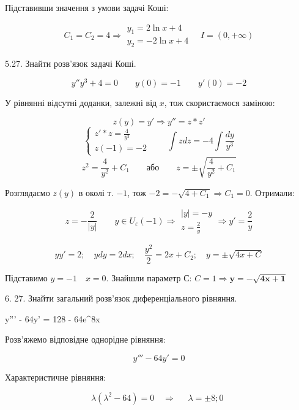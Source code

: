 \documentclass[14pt,a4paper]{scrartcl}
\theoremstyle{definition}
\theoremstyle{remark}
\theoremstyle{definition}
\theoremstyle{definition}
\begin{document}
Підставивши значення з умови задачі Коші:

$$
C_1 = C_2 = 4 \Longrightarrow \begin{gathered}
y_1 = 2\ln{x} + 4\\
y_2 = -2\ln{x} +4
\end{gathered}  \quad I = (0,  +\infty)
$$

\pagebreak

5.27. Знайти розв'язок задачі Коші.

$$
y''y^3 + 4 = 0 \qquad y(0) = -1 \qquad y'(0) = -2
$$

У рівнянні відсутні доданки, залежні від $x$, тож скористаємося заміною:

$$
z(y) = y' \Longrightarrow y'' = z * z'
$$
$$
\left\lbrace \begin{gathered}
z' * z = \frac{4}{y^3}\\
z(-1) = -2
\end{gathered} \right.
 \qquad  \int\limits_{}^{}{zdz} = -4  \int\limits_{}^{}{ \frac{dy}{y^3} }
$$
$$
z^2 = \frac{4}{y^2} + C_1 \qquad \text{або} \qquad z = \pm \sqrt{ \frac{4}{y^2} +C_1 }
$$

Розглядаємо $z(y)$ в околі т. $-1$, тож $ -2 = - \sqrt{ 4 + C_1} \Longrightarrow C_1 = 0$. Отримали:

$$
z = - \frac{2}{ \left| y \right| } \qquad y \in U_{\varepsilon}(-1) \Longrightarrow \begin{gathered}
 \left| y \right| = -y \\
 z = \frac{2}{y}
\end{gathered} \Longrightarrow y' = \frac{2}{y}
$$

$$
yy' = 2; \quad ydy = 2dx; \quad \frac{y^2}{2} = 2x+C_2; \quad y = \pm\sqrt{ 4x +C }
$$

Підставимо $y =-1 \quad x = 0$. Знайшли параметр $С$: $C=1 \Longrightarrow \mathbf{y = - \sqrt{4x+1}}$

\pagebreak

6. 27. Знайти загальний розв'язок диференціального рівняння.

\be
y''' - 64y' = 128  - 64e^{8x}
\ee

Розв'яжемо відповідне однорідне рівняння:

$$
y''' - 64y' = 0
$$

Характеристичне рівняння:

$$
\lambda( \lambda^2 - 64) = 0 \quad \Longrightarrow \quad \begin{gathered}
 \lambda = \pm 8;0
\end{gathered}
$$
\end{document}
